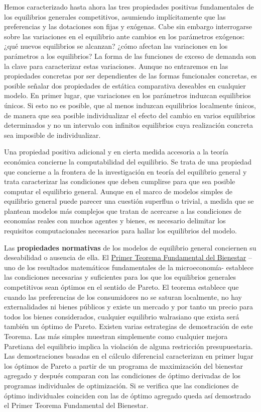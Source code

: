 \documentclass{nuevotema}
\begin{document}
Hemos caracterizado hasta ahora las tres propiedades positivas fundamentales de los equilibrios generales competitivos, asumiendo implícitamente que las preferencias y las dotaciones son fijas y exógenas. Cabe sin embargo interrogarse sobre las variaciones en el equilibrio ante cambios en los parámetros exógenos: ¿qué nuevos equilibrios se alcanzan? ¿cómo afectan las variaciones en los parámetros a los equilibrios? La forma de las funciones de exceso de demanda son la clave para caracterizar estas variaciones. Aunque no entraremos en las propiedades concretas por ser dependientes de las formas funcionales concretas, es posible señalar dos propiedades de estática comparativa deseables en cualquier modelo. En primer lugar, que variaciones en los parámetros induzcan equilibrios únicos. Si esto no es posible, que al menos induzcan equilibrios localmente únicos, de manera que sea posible individualizar el efecto del cambio en varios equilibrios determinados y no un intervalo con infinitos equilibrios cuya realización concreta sea imposible de individualizar.

Una propiedad positiva adicional y en cierta medida accesoria a la teoría económica concierne la computabilidad del equilibrio. Se trata de una propiedad que concierne a la frontera de la investigación en teoría del equilibrio general y trata caracterizar las condiciones que deben cumplirse para que sea posible computar el equilibrio general. Aunque en el marco de modelos simples de equilibrio general puede parecer una cuestión superflua o trivial, a medida que se plantean modelos más complejos que tratan de acercarse a las condiciones de economías reales con muchos agentes y bienes, es necesario delimitar los requisitos computacionales necesarios para hallar los equilibrios del modelo.

Las \textbf{propiedades normativas} de los modelos de equilibrio general conciernen su deseabilidad o ausencia de ella. El \underline{Primer Teorema Fundamental del Bienestar} --uno de los resultados matemáticos fundamentales de la microeconomía- establece las condiciones necesarias y suficientes para los que los equilibrios generales competitivos sean óptimos en el sentido de Pareto. El teorema establece que cuando las preferencias de los consumidores no se saturan localmente, no hay externalidades ni bienes públicos y existe un mercado y por tanto un precio para todos los bienes considerados, cualquier equilibrio walrasiano que exista será también un óptimo de Pareto. Existen varias estrategias de demostración de este Teorema. Las más simples muestran simplemente como cualquier mejora Paretiana del equilibrio implica la violación de alguna restricción presupuestaria. Las demostraciones basadas en el cálculo diferencial caracterizan en primer lugar los óptimos de Pareto a partir de un programa de maximización del bienestar agregado y después comparan con las condiciones de óptimo derivadas de los programas individuales de optimización. Si se verifica que las condiciones de óptimo individuales coinciden con las de óptimo agregado queda así demostrado el Primer Teorema Fundamental del Bienestar.
\end{document}
